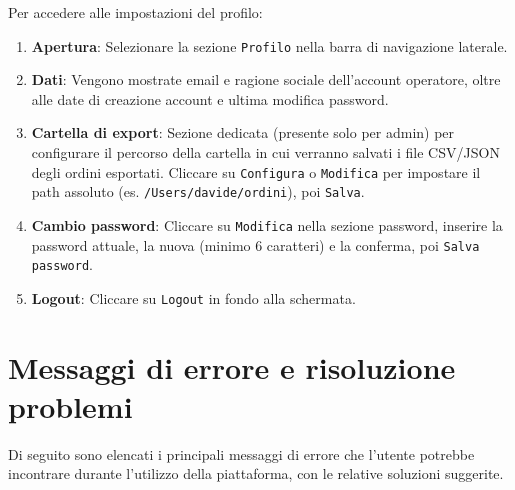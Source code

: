 \documentclass[a4paper, 11pt, oneside]{scrartcl}
\begin{document}
Per accedere alle impostazioni del profilo:

\begin{enumerate}
    \item \textbf{Apertura}: Selezionare la sezione \texttt{Profilo} nella barra di navigazione laterale.
    \item \textbf{Dati}: Vengono mostrate email e ragione sociale dell'account operatore, oltre alle date di creazione account e ultima modifica password.
    \item \textbf{Cartella di export}: Sezione dedicata (presente solo per admin) per configurare il percorso della cartella in cui verranno salvati i file CSV/JSON degli ordini esportati. Cliccare su \texttt{Configura} o \texttt{Modifica} per impostare il path assoluto (es. \texttt{/Users/davide/ordini}), poi \texttt{Salva}.
    \item \textbf{Cambio password}: Cliccare su \texttt{Modifica} nella sezione password, inserire la password attuale, la nuova (minimo 6 caratteri) e la conferma, poi \texttt{Salva password}.
    \item \textbf{Logout}: Cliccare su \texttt{Logout} in fondo alla schermata.
\end{enumerate}

\newpage
\section{Messaggi di errore e risoluzione problemi}

Di seguito sono elencati i principali messaggi di errore che l'utente potrebbe incontrare durante l'utilizzo della piattaforma, con le relative soluzioni suggerite.
\end{document}

